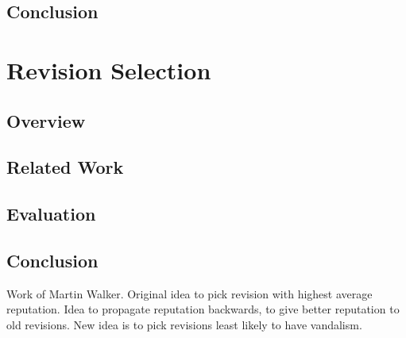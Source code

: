    \section{Conclusion}

\chapter{Revision Selection}
    \section{Overview}
    \section{Related Work}
    \section{Evaluation}
    \section{Conclusion}

    Work of Martin Walker.
    Original idea to pick revision with highest average reputation.
    Idea to propagate reputation backwards, to give better reputation
    to old revisions.
    New idea is to pick revisions least likely to have vandalism.


